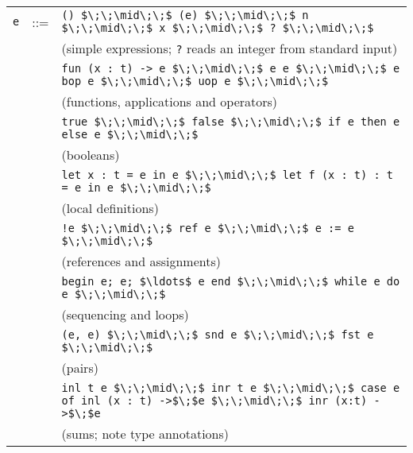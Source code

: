 \newcommand{\listinline}{\lstinline[mathescape, basicstyle=\ttfamily]}
\begin{tabular}{rcl}
{\listinline!e!} &::=& {\listinline!() $\;\;\mid\;\;$ (e) $\;\;\mid\;\;$ n $\;\;\mid\;\;$ x $\;\;\mid\;\;$ ? $\;\;\mid\;\;$!} \\[-0.2ex]
&& {\footnotesize\color{darkred}(simple expressions; \listinline!?! reads an integer from standard input)}\\
&& {\listinline!fun (x : t) -> e $\;\;\mid\;\;$ e e $\;\;\mid\;\;$ e bop e $\;\;\mid\;\;$ uop e $\;\;\mid\;\;$!}\\[-0.2ex]
&& {\footnotesize\color{darkred}(functions, applications and operators)}\\
&& {\listinline!true $\;\;\mid\;\;$ false $\;\;\mid\;\;$ if e then e else e $\;\;\mid\;\;$!}\\[-0.2ex]
&& {\footnotesize\color{darkred}(booleans)}\\

&& {\listinline!let x : t = e in e $\;\;\mid\;\;$ let f (x : t) : t = e in e $\;\;\mid\;\;$!}\\[-0.2ex]
&& {\footnotesize\color{darkred}(local definitions)}\\
&& {\listinline/!e $\;\;\mid\;\;$ ref e $\;\;\mid\;\;$ e := e $\;\;\mid\;\;$ /}\\[-0.2ex]
&& {\footnotesize\color{darkred}(references and assignments)}\\
&& {\listinline!begin e; e; $\ldots$ e end $\;\;\mid\;\;$ while e do e $\;\;\mid\;\;$!}\\[-0.2ex]
&& {\footnotesize\color{darkred}(sequencing and loops)}\\
&& {\listinline!(e, e) $\;\;\mid\;\;$ snd e $\;\;\mid\;\;$ fst e $\;\;\mid\;\;$!}\\[-0.2ex]
&& {\footnotesize\color{darkred}(pairs)}\\
&& {\listinline!inl t e $\;\;\mid\;\;$ inr t e $\;\;\mid\;\;$ case e of inl (x : t) ->$\;$e $\;\;\mid\;\;$ inr (x:t) ->$\;$e!} \\[-0.2ex]
&& {\footnotesize\color{darkred}(sums; note type annotations)}
\end{tabular}